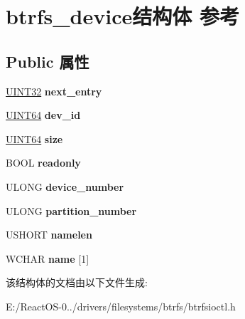 \hypertarget{structbtrfs__device}{}\section{btrfs\+\_\+device结构体 参考}
\label{structbtrfs__device}
\subsection*{Public 属性}
\begin{DoxyCompactItemize}
\item 
\mbox{\label{structbtrfs__device_a2d23b41011afda7d96a76af6b6a27e4f}} 
\hyperlink{_processor_bind_8h_ae1e6edbbc26d6fbc71a90190d0266018}{U\+I\+N\+T32} {\bfseries next\+\_\+entry}
\item 
\mbox{\label{structbtrfs__device_acc9a3aabe5e2c95c0851371c510a234f}} 
\hyperlink{_processor_bind_8h_a57be03562867144161c1bfee95ca8f7c}{U\+I\+N\+T64} {\bfseries dev\+\_\+id}
\item 
\mbox{\label{structbtrfs__device_aec3d45f36a1decd5a198ee9f1efa2b4d}} 
\hyperlink{_processor_bind_8h_a57be03562867144161c1bfee95ca8f7c}{U\+I\+N\+T64} {\bfseries size}
\item 
\mbox{\label{structbtrfs__device_ab6a36cc9ec358a799d337d0eccc01457}} 
B\+O\+OL {\bfseries readonly}
\item 
\mbox{\label{structbtrfs__device_a812f48eac0bfa4278e6b5d53a3b74d73}} 
U\+L\+O\+NG {\bfseries device\+\_\+number}
\item 
\mbox{\label{structbtrfs__device_a4788b5c271d3852660427b82cce103f1}} 
U\+L\+O\+NG {\bfseries partition\+\_\+number}
\item 
\mbox{\label{structbtrfs__device_a05cd84625346b8334af9512762973281}} 
U\+S\+H\+O\+RT {\bfseries namelen}
\item 
\mbox{\label{structbtrfs__device_ae2eb6113f0f3a15b3072a5303f3d9fdc}} 
W\+C\+H\+AR {\bfseries name} \mbox{[}1\mbox{]}
\end{DoxyCompactItemize}


该结构体的文档由以下文件生成\+:\begin{DoxyCompactItemize}
\item 
E\+:/\+React\+O\+S-\/0../drivers/filesystems/btrfs/btrfsioctl.\+h\end{DoxyCompactItemize}
